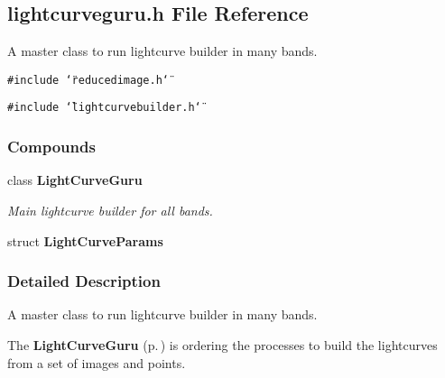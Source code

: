 \subsection{lightcurveguru.h File Reference}
\label{lightcurveguru_h}
A master class to run lightcurve builder in many bands. 


{\tt \#include \char`\"{}reducedimage.h\char`\"{}}\par
{\tt \#include \char`\"{}lightcurvebuilder.h\char`\"{}}\par
\subsubsection*{Compounds}
\begin{CompactItemize}
\item 
class {\bf Light\-Curve\-Guru}
\begin{CompactList}\small\item\em Main lightcurve builder for all bands.\item\end{CompactList}\item 
struct {\bf Light\-Curve\-Params}
\end{CompactItemize}


\subsubsection{Detailed Description}
A master class to run lightcurve builder in many bands.

 

 The {\bf Light\-Curve\-Guru} {\rm (p.\,\pageref{class_lightcurveguru})} is ordering the processes to build the lightcurves from a set of images and points.

